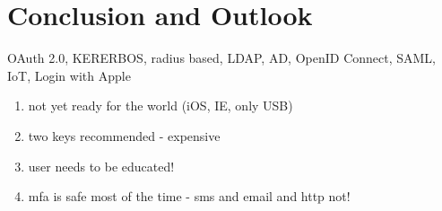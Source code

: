 \chapter{Conclusion and Outlook}

OAuth 2.0, KERERBOS, radius based, LDAP, AD, OpenID Connect, SAML, IoT, Login with Apple

\begin{enumerate}
	\item not yet ready for the world (iOS, IE, only USB)
	\item two keys recommended - expensive
	\item user needs to be educated!
	\item mfa is safe most of the time - sms and email and http not!
\end{enumerate}